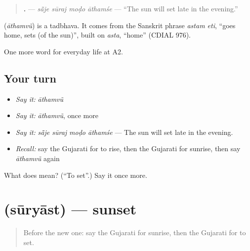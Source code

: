 \begin{quote}
\textbf{   .} — \emph{sā̃je sūraj moḍo āthamśe} — \textquotedblleft{}The sun will set late in the evening.\textquotedblright{}
\end{quote}

\begin{cousinweb}
\textbf{} (\emph{āthamvũ}) is a tadbhava. It comes from the Sanskrit phrase \emph{astam eti}, \textquotedblleft{}goes home, sets (of the sun)\textquotedblright{}, built on \emph{asta}, \textquotedblleft{}home\textquotedblright{} (CDIAL 976).
\end{cousinweb}

\begin{grammarlens}[title={What you've built}]
One more word for everyday life at A2.
\end{grammarlens}

\subsection*{Your turn}
\begin{itemize}
\raggedright
  \item \emph{Say it:} \emph{āthamvũ}
  \item \emph{Say it:} \emph{āthamvũ}, once more
  \item \emph{Say it:} \emph{sā̃je sūraj moḍo āthamśe} — The sun will set late in the evening.
  \item \emph{Recall:} say the Gujarati for to rise, then the Gujarati for sunrise, then say \emph{āthamvũ} again
\end{itemize}

\begin{tcolorbox}[breakable,colback=teal!4,colframe=teal!35!black,title={Before you move on}]
What does  mean? (\textquotedblleft{}To set\textquotedblright{}.) Say it once more.
\end{tcolorbox}
\section[\texorpdfstring{\gu{સૂર્યાસ્ત} (sūryāst)}{સૂર્યાસ્ત (sūryāst)}]{ (sūryāst) — sunset}

\label{lesson:GU-C218-suryast}



\begin{quote}
Before the new one: say the Gujarati for sunrise, then the Gujarati for to set.
\end{quote}

